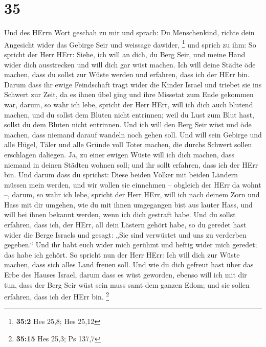 \hypertarget{section-34}{%
\section{35}\label{section-34}}

 Und des HErrn Wort geschah zu mir und sprach:
 Du Menschenkind, richte dein Angesicht wider das Gebirge
Seir und weissage dawider, \footnote{\textbf{35:2} Hes 25,8; Hes 25,12}
 und sprich zu ihm: So spricht der Herr HErr: Siehe, ich
will an dich, du Berg Seir, und meine Hand wider dich ausstrecken und
will dich gar wüst machen.  Ich will deine Städte öde
machen, dass du sollst zur Wüste werden und erfahren, dass ich der HErr
bin.  Darum dass ihr ewige Feindschaft tragt wider die
Kinder Israel und triebet sie ins Schwert zur Zeit, da es ihnen übel
ging und ihre Missetat zum Ende gekommen war,  darum, so
wahr ich lebe, spricht der Herr HErr, will ich dich auch blutend machen,
und du sollst dem Bluten nicht entrinnen; weil du Lust zum Blut hast,
sollst du dem Bluten nicht entrinnen.  Und ich will den
Berg Seir wüst und öde machen, dass niemand darauf wandeln noch gehen
soll.  Und will sein Gebirge und alle Hügel, Täler und
alle Gründe voll Toter machen, die durchs Schwert sollen erschlagen
daliegen.  Ja, zu einer ewigen Wüste will ich dich machen,
dass niemand in deinen Städten wohnen soll; und ihr sollt erfahren, dass
ich der HErr bin.  Und darum dass du sprichst: Diese
beiden Völker mit beiden Ländern müssen mein werden, und wir wollen sie
einnehmen -- obgleich der HErr da wohnt --,  darum, so
wahr ich lebe, spricht der Herr HErr, will ich nach deinem Zorn und Hass
mit dir umgehen, wie du mit ihnen umgegangen bist aus lauter Hass, und
will bei ihnen bekannt werden, wenn ich dich gestraft habe.
 Und du sollst erfahren, dass ich, der HErr, all dein
Lästern gehört habe, so du geredet hast wider die Berge Israels und
gesagt: „Sie sind verwüstet und uns zu verderben gegeben.``
 Und ihr habt euch wider mich gerühmt und heftig wider
mich geredet; das habe ich gehört.  So spricht nun der
Herr HErr: Ich will dich zur Wüste machen, dass sich alles Land freuen
soll.  Und wie du dich gefreut hast über das Erbe des
Hauses Israel, darum dass es wüst geworden, ebenso will ich mit dir tun,
dass der Berg Seir wüst sein muss samt dem ganzen Edom; und sie sollen
erfahren, dass ich der HErr bin. \footnote{\textbf{35:15} Hes 25,3; Ps
  137,7}

